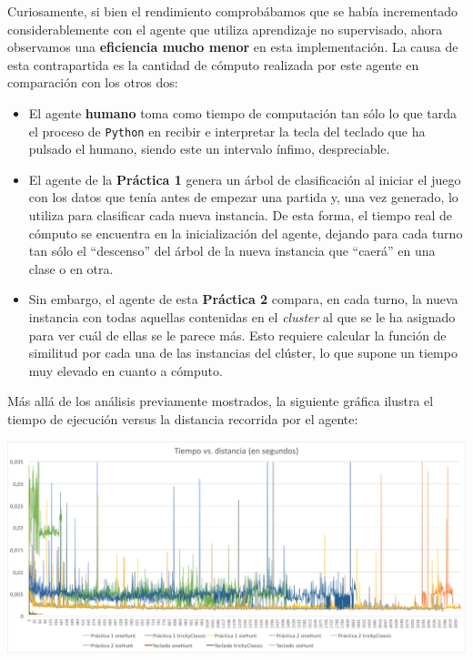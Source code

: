 \documentclass[12pt]{article}
\begin{document}
Curiosamente, si bien el rendimiento comprobábamos que se había incrementado considerablemente con el agente que utiliza aprendizaje no supervisado, ahora observamos una \textbf{eficiencia mucho menor} en esta implementación. La causa de esta contrapartida es la cantidad de cómputo realizada por este agente en comparación con los otros dos:
\begin{itemize}
    \item El agente \textbf{humano} toma como tiempo de computación tan sólo lo que tarda el proceso de \texttt{Python} en recibir e interpretar la tecla del teclado que ha pulsado el humano, siendo este un intervalo ínfimo, despreciable.
    \item El agente de la \textbf{Práctica 1} genera un árbol de clasificación al iniciar el juego con los datos que tenía antes de empezar una partida y, una vez generado, lo utiliza para clasificar cada nueva instancia. De esta forma, el tiempo real de cómputo se encuentra en la inicialización del agente, dejando para cada turno tan sólo el ``descenso'' del árbol de la nueva instancia que ``caerá'' en una clase o en otra.
    \item Sin embargo, el agente de esta \textbf{Práctica 2} compara, en cada turno, la nueva instancia con todas aquellas contenidas en el \textit{cluster} al que se le ha asignado para ver cuál de ellas se le parece más. Esto requiere calcular la función de similitud por cada una de las instancias del clúster, lo que supone un tiempo muy elevado en cuanto a cómputo.
\end{itemize}

Más allá de los análisis previamente mostrados, la siguiente gráfica ilustra el tiempo de ejecución versus la distancia recorrida por el agente:

\begin{center}
    \includegraphics[width=16.7cm]{tiempoVsDistancia}
\end{center}
\end{document}
